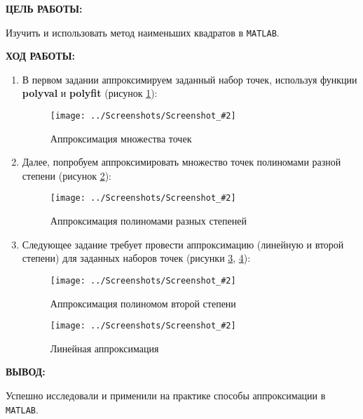 \documentclass[14pt,a4paper]{extreport}
\newcommand{\sshot}[2]{\begin{figure}[ht]%
\centering\texttt{[image: ../Screenshots/Screenshot\_\#2]}%
\caption{#1}%
\label{sshot#2}%
\end{figure}%
}
\newcommand{\header}[1]{%
{
\clearpage%
\fontsize{16pt}{14pt}\selectfont
\begin{center}
\textbf{\MakeUppercase{#1}:}
\end{center}
}
}
\newcommand{\matlab}{\texttt{\MakeUppercase{matlab}}}
\begin{document}
\header{Цель работы}

Изучить и использовать метод наименьших квадратов в \matlab.

\header{Ход работы}


\begin{enumerate}

\item В первом задании аппроксимируем заданный набор точек, используя функции \textbf{polyval} и \textbf{polyfit} (рисунок \ref{sshot1}): 

\sshot{Аппроксимация множества точек}{1}

\item Далее, попробуем аппроксимировать множество точек полиномами разной степени (рисунок \ref{sshot2}):

\sshot{Аппроксимация полиномами разных степеней}{2}

\item Следующее задание требует провести аппроксимацию (линейную и второй степени) для заданных наборов точек (рисунки \ref{sshot3}, \ref{sshot4}):

\sshot{Аппроксимация полиномом второй степени}{3}
\sshot{Линейная аппроксимация}{4}

\end{enumerate}


\header{Вывод}

Успешно исследовали и применили на практике способы аппроксимации в \matlab.
\end{document}
